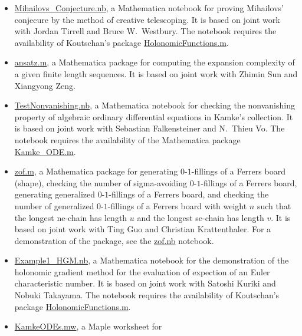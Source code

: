 \documentclass[a4paper,12pt]{article}
\begin{document}
\begin{itemize}
\item \href{https://yzhang1616.github.io/ct/Mihailovs_Conjecture.nb}{Mihailovs\_Conjecture.nb},  a Mathematica notebook for 
proving Mihailovs' conjecure by the method of creative telescoping. It is based on joint work
with Jordan Tirrell and Bruce W.\ Westbury.   The notebook requires the availability of Koutschan's package 
 \href{http://www.risc.jku.at/research/combinat/software/ergosum/RISC/HolonomicFunctions.html}{HolonomicFunctions.m}.
\item \href{https://yzhang1616.github.io/complexity/ansatz.m}{ansatz.m}, 
a Mathematica package for computing the expansion complexity of a given finite length sequences. 
It is based on joint work with Zhimin Sun and Xiangyong Zeng. 
  \item \href{https://yzhang1616.github.io/TestNonvanishing.nb}{TestNonvanishing.nb}, 
    a Mathematica notebook for checking the nonvanishing property of algebraic ordinary
    differential equations in Kamke's collection. It is based on joint work
    with Sebastian Falkensteiner and N.\ Thieu Vo. 
    The notebook requires the availability of the Mathematica package \href{https://yzhang1616.github.io/Kamke_ODE.m}{Kamke\_ODE.m}.
  \item \href{https://yzhang1616.github.io/zof/zof.m}{zof.m}, a Mathematica package for generating $0$-$1$-fillings 
  of a Ferrers board (shape), checking the number of
    sigma-avoiding $0$-$1$-fillings of a Ferrers board, 
     generating generalized $0$-$1$-fillings of a Ferrers board, 
     and checking the number of generalized $0$-$1$-fillings of a Ferrers board with weight $n$
    such that the longest ne-chain has length $u$ 
    and the longest se-chain has length $v$. It is based on joint work with Ting
    Guo and Christian Krattenthaler. For a demonstration of the package,
    see the \href{https://yzhang1616.github.io/zof/zof.nb}{zof.nb} notebook. 
  \item \href{https://yzhang1616.github.io/ec1/Example1_HGM.nb}{Example1\_HGM.nb}, a Mathematica notebook for
    the demonstration of the holonomic gradient method for the evaluation of
    expection of an Euler characteristic number. It is based on joint work
    with Satoshi Kuriki and Nobuki Takayama. 
    The notebook requires the availability of Koutschan's package 
     \href{http://www.risc.jku.at/research/combinat/software/ergosum/RISC/HolonomicFunctions.html}{HolonomicFunctions.m}.
  \item \href{https://yzhang1616.github.io/KamkeODEs.mw}{KamkeODEs.mw}, a Maple worksheet for 

\end{itemize}
\end{document}
